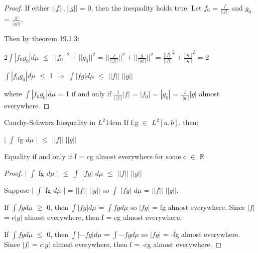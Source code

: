     \begin{proof}
        If either $||f||,||g||$ = 0, then the inequality holds true.
        Let $f_0$ = $\frac{f}{||f||}$ and $g_0$ = $\frac{g}{||g||}$.

        Then by {\color{red} theorem 19.1.3}:

        \hspace{0.5cm}
        $2 \int |f_0g_0| d\mu$
        $\leq$ $||f_0||^2 + ||g_0||^2$
        = $||\frac{f}{||f||}||^2 + ||\frac{g}{||g||}||^2$
        = $\frac{||f||}{||f||}^2 + \frac{||g||}{||g||}^2$
        = 2

        \hspace{0.5cm}
        $\int |f_0g_0| d\mu$ $\leq$ 1
        \hspace{0.5cm}
        $\Rightarrow$
        \hspace{0.5cm}
        $\int |fg| d\mu$ $\leq$ $||f||$ $||g||$

        where $\int |f_0g_0| d\mu$ = 1 if and only if
        $\frac{1}{||f||}|f|$ = $|f_0|$ = $|g_0|$ = $\frac{1}{||g||}|g|$
        almost everywhere.
    \end{proof}

    \newpage



    \begin{corollary}{Cauchy-Schwarz Inequality in $L^2$}{14cm}
        If f,g $\in$ $L^2[a,b]$, then:
        
        \hspace{0.5cm}
        $|$ $\int$ fg $d\mu$ $|$ $\leq$ $||f||$ $||g||$

        Equality if and only if
        f = cg almost everywhere for some c $\in$ $\mathbb{R}$ 
    \end{corollary}

    \begin{proof}
        $|$ $\int$ fg $d\mu$ $|$
        $\leq$ $\int$ $|fg|$ $d\mu$
        $\leq$ $||f||$ $||g||$

        Suppose $|$ $\int$ fg $d\mu$ $|$ = $||f||$ $||g||$
        so $\int$ $|fg|$ $d\mu$ = $||f||$ $||g||$.

        If $\int fg d\mu$ $\geq$ 0, then $\int |fg| d\mu$ = $\int fg d\mu$
        so $|fg|$ = fg almost everywhere.
        Since $|f|$ = $c|g|$ almost everywhere, then
        f = cg almost everywhere.

        If $\int fg d\mu$ $\leq$ 0, then $\int |-fg| d\mu$ = $\int -fg d\mu$
        so $|fg|$ = -fg almost everywhere.
        Since $|f|$ = $c|g|$ almost everywhere, then
        f = -cg almost everywhere.
    \end{proof}

